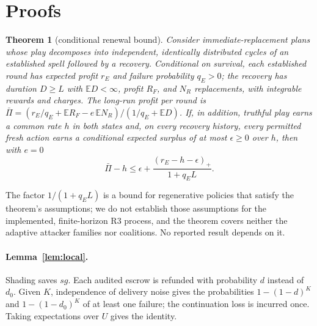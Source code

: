 \documentclass[11pt]{article}
\newtheorem{theorem}{Theorem}\newtheorem{lemma}{Lemma}\newtheorem{corollary}{Corollary}\newtheorem{proposition}{Proposition}
\begin{document}
\FloatBarrier
\section{Proofs}\label{sec:app-proofs}\label{app:proofs}
\begin{theorem}[conditional renewal bound]\label{thm:renewal}
Consider immediate-replacement plans whose play decomposes into independent, identically distributed cycles of an established spell followed by a recovery. Conditional on survival, each established round has expected profit $r_E$ and failure probability $q_E > 0$; the recovery has duration $D \ge L$ with $\mathbb{E}D < \infty$, profit $R_F$, and $N_R$ replacements, with integrable rewards and charges. The long-run profit per round is $\bar\Pi = (r_E/q_E + \mathbb{E}R_F - e\,\mathbb{E}N_R)/(1/q_E + \mathbb{E}D)$. If, in addition, truthful play earns a common rate $h$ in both states and, on every recovery history, every permitted fresh action earns a conditional expected surplus of at most $\epsilon \ge 0$ over $h$, then with $e = 0$
\[ \bar\Pi - h \le \epsilon + \frac{(r_E - h - \epsilon)_+}{1 + q_E L}. \]
\end{theorem}

The factor $1/(1 + q_E L)$ is a bound for regenerative policies that satisfy the theorem's assumptions; we do not establish those assumptions for the implemented, finite-horizon R3 process, and the theorem covers neither the adaptive attacker families nor coalitions. No reported result depends on it.

\paragraph{Lemma~\ref{lem:local}.} Shading saves $sg$. Each audited escrow is refunded with probability $d$ instead of $d_0$. Given $K$, independence of delivery noise gives the probabilities $1 - (1-d)^K$ and $1 - (1-d_0)^K$ of at least one failure; the continuation loss is incurred once. Taking expectations over $U$ gives the identity.
\end{document}
